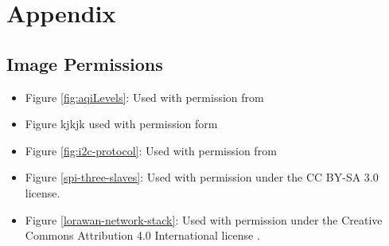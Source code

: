 \section{Appendix}
\subsection{Image Permissions}


\begin{itemize}
\item Figure \ref{fig:aqiLevels}: Used with permission from

\item Figure kjkjk used with permission form \cite{Thin-Film-Solar-Cell}

\item Figure \ref{fig:i2c-protocol}: Used with permission from \cite{i2c-protocol}

\item Figure \ref{spi-three-slaves}: Used with permission under the CC BY-SA 3.0 license. \cite{spi-image}

\item Figure \ref{lorawan-network-stack}: Used with permission under the Creative Commons Attribution 4.0 International license \cite{lorawan-network-stack}.


\end{itemize}
